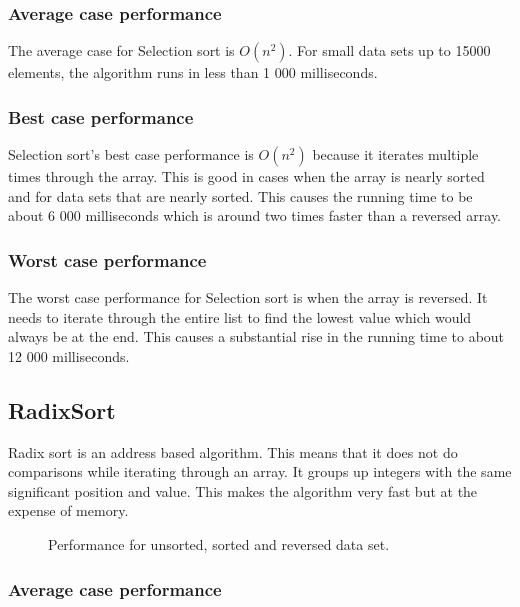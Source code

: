 \documentclass{acm_proc_article-sp}
\begin{document}
\subsubsection{Average case performance}

The average case for Selection sort is $O(n^{2})$. For small data sets up to 15000 elements, the algorithm runs in less than 1 000 milliseconds. 

\subsubsection{Best case performance}

Selection sort's best case performance is $O(n^{2})$ because it iterates multiple times through the array. This is good in cases when the array is nearly sorted and for data sets that are nearly sorted. This causes the running time to be about 6 000 milliseconds which is around two times faster than a reversed array.

\subsubsection{Worst case performance}

The worst case performance for Selection sort is when the array is reversed. It needs to iterate through the entire list to find the lowest value which would always be at the end. This causes a substantial rise in the running time to about 12 000 milliseconds.

\subsection{RadixSort}

Radix sort is an address based algorithm. This means that it does not do comparisons while iterating through an array. It groups up integers with the same significant position and value. This makes the algorithm very fast but at the expense of memory.

\begin{figure}[!htb]
\caption{Performance for unsorted, sorted and reversed data set.}
\end{figure}

\subsubsection{Average case performance}
\end{document}
